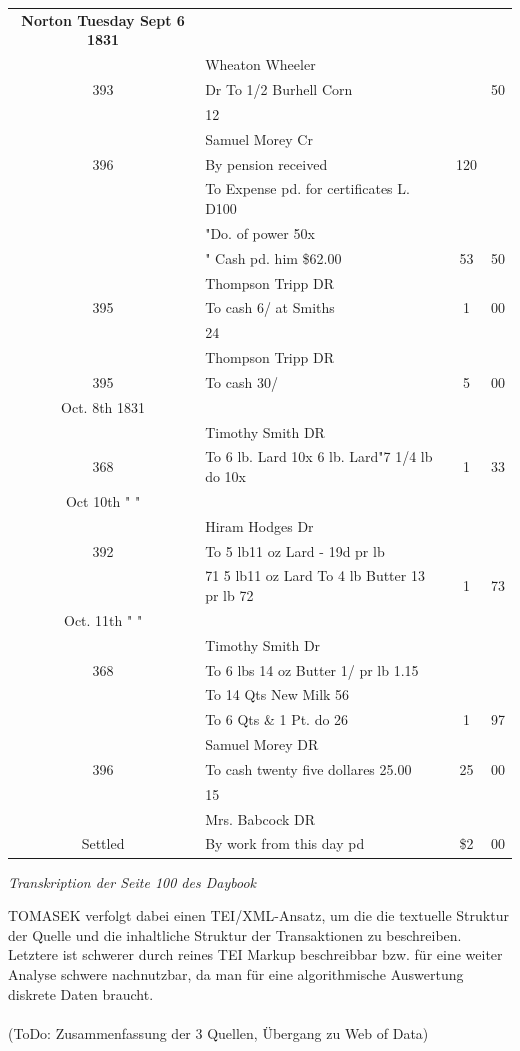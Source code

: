 \documentclass[12pt,a4paper]{article}
\begin{document}
\begin{tabular}{clcc}
 \textbf{Norton Tuesday Sept 6 1831}\\
    & Wheaton Wheeler & &\\
393 & Dr To 1/2 Burhell Corn & & 50 \\
    & 12 & &\\
    & Samuel Morey  Cr  & &\\
396 & By pension received & 120 & \\
    & To Expense pd. for certificates L. D100 & &\\
    & "Do. of power 50x & &\\
    & " Cash pd. him \$62.00 & 53 & 50\\
    & Thompson Tripp  DR  & &\\
395 & To cash 6/ at Smiths & 1 & 00\\	
    & 24 & &\\
    & Thompson Tripp  DR & &\\	
395 & To cash 30/ & 5  & 00\\		
Oct. 8th 1831\\
    & Timothy Smith DR & &\\
368 & To 6 lb. Lard 10x 6 lb. Lard"7 1/4 lb do 10x & 1 & 33 \\
Oct 10th " "\\
    & Hiram Hodges Dr & &\\
392 & To 5 lb11 oz Lard - 19d pr lb\\
    & 71 5 lb11 oz Lard To 4 lb Butter 13 pr lb 72 & 1 & 73\\
Oct. 11th " "\\
    & Timothy Smith  Dr& &\\
368 & To 6 lbs 14 oz Butter 1/ pr lb 1.15 & & \\ & To 14 Qts New Milk 56 & &\\
& To 6 Qts \& 1 Pt. do 26 & 1 & 97 	\\	
    & Samuel Morey DR & &\\
396 & To cash twenty five dollares 25.00 & 25 & 00\\
    & 15 & & \\	
    & Mrs. Babcock DR  & & \\		
Settled & By work from this day pd & \$2 & 00
\end{tabular}
\medskip
\begin{center}
\textit{Transkription der Seite 100 des \textit{Daybook}}
\end{center}
TOMASEK verfolgt dabei einen TEI/XML-Ansatz, um die die textuelle Struktur der Quelle und die inhaltliche Struktur der Transaktionen zu beschreiben. Letztere ist schwerer durch reines TEI Markup beschreibbar bzw. für eine weiter Analyse schwere nachnutzbar, da man für eine algorithmische Auswertung diskrete Daten braucht.
\\
\\
(ToDo: Zusammenfassung der 3 Quellen, Übergang zu Web of Data)
\end{document}
